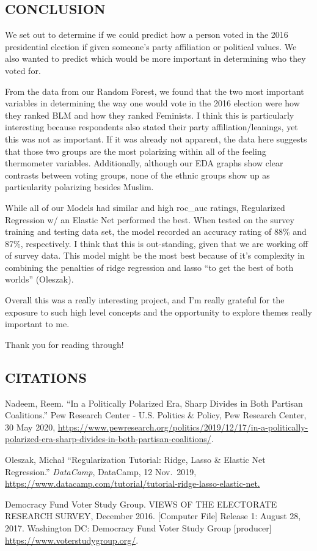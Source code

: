 \documentclass[
]{article}
\begin{document}
\hypertarget{conclusion}{%
\subsection{CONCLUSION}\label{conclusion}}

We set out to determine if we could predict how a person voted in the
2016 presidential election if given someone's party affiliation or
political values. We also wanted to predict which would be more
important in determining who they voted for.

From the data from our Random Forest, we found that the two most
important variables in determining the way one would vote in the 2016
election were how they ranked BLM and how they ranked Feminists. I think
this is particularly interesting because respondents also stated their
party affiliation/leanings, yet this was not as important. If it was
already not apparent, the data here suggests that those two groups are
the most polarizing within all of the feeling thermometer variables.
Additionally, although our EDA graphs show clear contrasts between
voting groups, none of the ethnic groups show up as particularity
polarizing besides Muslim.

While all of our Models had similar and high roc\_auc ratings,
Regularized Regression w/ an Elastic Net performed the best. When tested
on the survey training and testing data set, the model recorded an
accuracy rating of 88\% and 87\%, respectively. I think that this is
out-standing, given that we are working off of survey data. This model
might be the most best because of it's complexity in combining the
penalties of ridge regression and lasso ``to get the best of both
worlds'' (Oleszak).

Overall this was a really interesting project, and I'm really grateful
for the exposure to such high level concepts and the opportunity to
explore themes really important to me.

Thank you for reading through!

\hypertarget{citations}{%
\subsection{CITATIONS}\label{citations}}

Nadeem, Reem. ``In a Politically Polarized Era, Sharp Divides in Both
Partisan Coalitions.'' Pew Research Center - U.S. Politics \& Policy,
Pew Research Center, 30 May 2020,
\url{https://www.pewresearch.org/politics/2019/12/17/in-a-politically-polarized-era-sharp-divides-in-both-partisan-coalitions/}.

Oleszak, Michał ``Regularization Tutorial: Ridge, Lasso \& Elastic Net
Regression.'' \emph{DataCamp}, DataCamp, 12 Nov.~2019,
\url{https://www.datacamp.com/tutorial/tutorial-ridge-lasso-elastic-net.}

Democracy Fund Voter Study Group. VIEWS OF THE ELECTORATE RESEARCH
SURVEY, December 2016. {[}Computer File{]} Release 1: August 28, 2017.
Washington DC: Democracy Fund Voter Study Group {[}producer{]}
\url{https://www.voterstudygroup.org/}.
\end{document}
